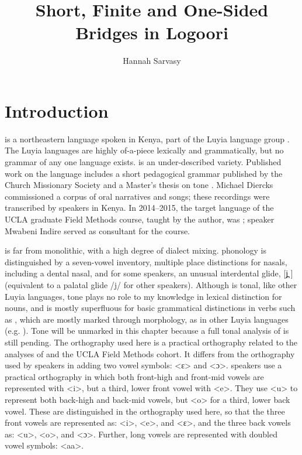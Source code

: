 \documentclass[output=paper]{LSP/langsci}
\author{
  Hannah Sarvasy\affiliation{Australian National University}
}
\title{Short, Finite and One-Sided Bridges in Logoori}
\begin{document}
\section{Introduction}
\label{Saintro}
 is a northeastern  language spoken in Kenya, part of the Luyia language group \citep{Mould1981}. The Luyia languages are highly of-a-piece lexically and grammatically, but no grammar of any one language exists.  is an under-described variety. Published work on the language includes a short pedagogical grammar published by the Church Missionary Society \citep{Appleby1961} and a Master’s thesis on  tone \citep{Leung1991}. Michael Diercks commissioned a corpus of  oral narratives and songs; these recordings were transcribed by  speakers in Kenya. In 2014--2015, the target language of the UCLA graduate Field Methods course, taught by the author, was ; speaker Mwabeni Indire served as consultant for the course. 

 is far from monolithic, with a high degree of dialect mixing.  phonology is distinguished by a seven-vowel inventory, multiple place distinctions for nasals, including a dental nasal, and for some speakers, an unusual interdental glide, [j̪ ]  (equivalent to a palatal glide /j/ for other speakers). Although  is tonal, like other Luyia languages, tone plays no role to my knowledge in lexical distinction for nouns, and is mostly superfluous for basic grammatical distinctions in verbs such as , which are mostly marked through morphology, as in other Luyia languages (e.g. \citealt{Marlo2008}). Tone will be unmarked in this chapter because a full tonal analysis of  is still pending. The orthography used here is a practical orthography related to the analyses of \citet{Leung1991} and the UCLA Field Methods cohort. It differs from the orthography used by speakers in adding two vowel symbols: <ɛ> and <ɔ>.  speakers use a practical orthography in which both front-high and front-mid vowels are represented with <i>, but a third, lower front vowel with <e>. They use <u> to represent both back-high and back-mid vowels, but <o> for a third, lower back vowel. These are distinguished in the orthography used here, so that the three front vowels are represented as: <i>, <e>, and <ɛ>, and the three back vowels as: <u>, <o>, and <ɔ>. Further, long vowels are represented with doubled vowel symbols: <aa>. 
\end{document}
